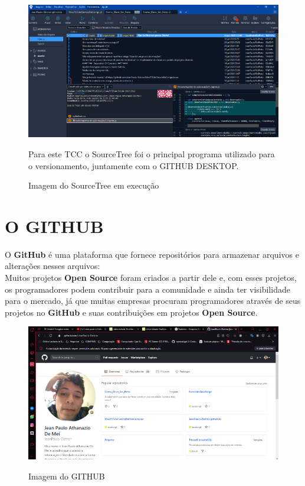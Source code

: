 \begin{figure}
	\centering
	\caption{Imagem do SourceTree em execução}
	\centering
	\includegraphics[scale=0.9]{./images/Figure_2}	
	
	Para este TCC o SourceTree foi o principal programa utilizado para o versionamento, juntamente com o GITHUB DESKTOP.	
	
	\label{fig:Fig2}
\end{figure}

\section{O GITHUB}
\label{OGitHub}

O \textbf{GitHub} é uma plataforma que fornece repositórios para armazenar arquivos e alterações nesses arquivos:\\ 
Muitos projetos \textbf{Open Source} foram criados a partir dele e, com esses projetos, os programadores podem contribuir para a comunidade e ainda ter visibilidade para o mercado, já que muitas empresas procuram programadores através de seus projetos no \textbf{GitHub} e suas contribuições em projetos \textbf{Open Source}. 

\begin{figure}[H]
	\centering
	\caption{Imagem do GITHUB}
	\includegraphics[scale=0.75]{./images/Figure_3}		
	\label{fig:Fig3}
\end{figure}

